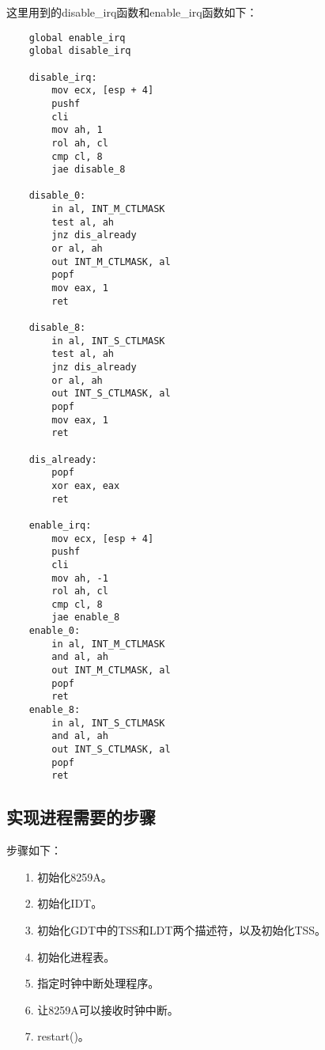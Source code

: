 \documentclass[a4paper,left=2.5cm,right=2.5cm,11pt]{report}
\begin{document}
	这里用到的disable\_irq函数和enable\_irq函数如下：
	\begin{lstlisting}
	global enable_irq
	global disable_irq

	disable_irq:
		mov ecx, [esp + 4]
		pushf
		cli
		mov ah, 1
		rol ah, cl
		cmp cl, 8
		jae disable_8

	disable_0:
		in al, INT_M_CTLMASK
		test al, ah
		jnz dis_already
		or al, ah
		out INT_M_CTLMASK, al
		popf
		mov eax, 1
		ret

	disable_8:
		in al, INT_S_CTLMASK
		test al, ah
		jnz dis_already
		or al, ah
		out INT_S_CTLMASK, al
		popf
		mov eax, 1
		ret

	dis_already:
		popf
		xor eax, eax
		ret

	enable_irq:
		mov ecx, [esp + 4]
		pushf
		cli
		mov ah, -1
		rol ah, cl
		cmp cl, 8
		jae enable_8
	enable_0:
		in al, INT_M_CTLMASK
		and al, ah
		out INT_M_CTLMASK, al
		popf
		ret
	enable_8:
		in al, INT_S_CTLMASK
		and al, ah
		out INT_S_CTLMASK, al
		popf
		ret
	\end{lstlisting}

\subsection{实现进程需要的步骤}
	步骤如下：
	\begin{itemize}
		\item[1.] 初始化8259A。
		\item[2.] 初始化IDT。
		\item[3.] 初始化GDT中的TSS和LDT两个描述符，以及初始化TSS。
		\item[4.] 初始化进程表。
		\item[5.] 指定时钟中断处理程序。
		\item[6.] 让8259A可以接收时钟中断。
		\item[7.] restart()。
	\end{itemize}
\end{document}
